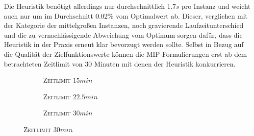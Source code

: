 Die Heuristik benötigt allerdings nur durchschnittlich $1.7s$ pro Instanz und weicht auch nur um im Durchschnitt $0.02 \%$ vom Optimalwert ab. Dieser, verglichen mit der Kategorie der mittelgroßen Instanzen, noch gravierende Laufzeitunterschied und die zu vernachlässigende Abweichung vom Optimum sorgen dafür, dass die Heuristik in der Praxis erneut klar bevorzugt werden sollte.
Selbst in Bezug auf die Qualität der Zielfunktionswerte können die MIP-Formulierungen erst ab dem betrachteten Zeitlimit von $30$ Minuten mit denen der Heuristik konkurrieren.

\begin{figure}[H]
\begin{subfigure}[b]{0.3\textwidth}
\centering
{}
\caption{\textsc{Zeitlimit} $15min$}
\label{fig:res_b=2_l_a}
\end{subfigure}
\begin{subfigure}[b]{0.3\textwidth}
\centering
{}
\caption{\textsc{Zeitlimit} $22.5min$}
\label{fig:res_b=2_l_b}
\end{subfigure}
\begin{subfigure}[b]{0.3\textwidth}
\centering
{}
\caption{\textsc{Zeitlimit} $30min$}
\label{fig:res_b=2_l_c}
\end{subfigure}


\end{figure}
